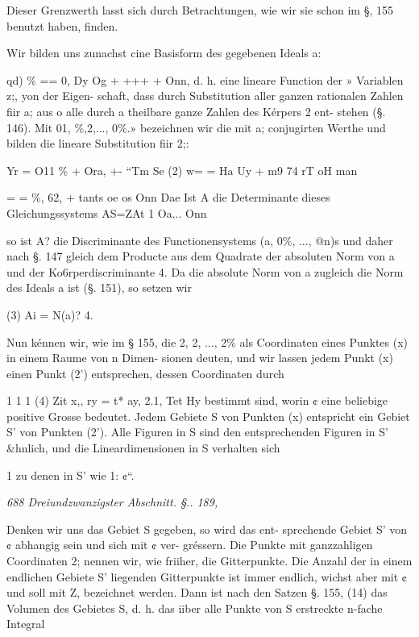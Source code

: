 \documentclass[12pt,a4paper]{article}
\theoremstyle{plain}
\theoremstyle{definition}
\begin{document}
Dieser Grenzwerth lasst sich durch Betrachtungen, wie wir sie schon im §, 155 benutzt haben, finden.

Wir bilden uns zunachst cine Basisform des gegebenen Ideals a:

qd) \% == 0, Dy Og + +++ + Onn, d. h. eine lineare Function der » Variablen z;, yon der Eigen- schaft, dass durch Substitution aller ganzen rationalen Zahlen fiir a; aus o alle durch a theilbare ganze Zahlen des Kérpers 2 ent- stehen (§. 146). Mit 01, \%,2,..., 0\%.» bezeichnen wir die mit a; conjugirten Werthe und bilden die lineare Substitution fiir 2;:

Yr = O11 \% + Ora, +- ``Tm Se (2) w= = Ha Uy + m9 74 rT oH man

= = \%, 62, + tants oe os Onn Dae Ist A die Determinante dieses Gleichungssystems AS=ZAt 1 Oa... Onn

so ist A? die Discriminante des Functionensystems (a, 0\%, ..., @n)s und daher nach §. 147 gleich dem Producte aus dem Quadrate der absoluten Norm von a und der Ko6rperdiscriminante 4. Da die absolute Norm von a zugleich die Norm des Ideals a ist (§. 151), so setzen wir

(3) Ai = N(a)? 4.

Nun kénnen wir, wie im § 155, die 2, 2, ..., 2\% als Coordinaten eines Punktes (x) in einem Raume von n Dimen- sionen deuten, und wir lassen jedem Punkt (x) einen Punkt (2') entsprechen, dessen Coordinaten durch

1 1 1 (4) Zit x,, ry = t* ay, 2.1, Tet Hy bestimmt sind, worin ¢ eine beliebige positive Grosse bedeutet. Jedem Gebiete S von Punkten (x) entspricht ein Gebiet S' von Punkten (2'). Alle Figuren in S sind den entsprechenden Figuren in S' \&hnlich, und die Lineardimensionen in S verhalten sich

1 zu denen in S' wie 1: ¢``.

\vspace{0.5\baselineskip}\noindent\textit{688 Dreiundzwanzigster Abschnitt. §.. 189,}\par

Denken wir uns das Gebiet S gegeben, so wird das ent- sprechende Gebiet S' von ¢ abhangig sein und sich mit ¢ ver- gréssern. Die Punkte mit ganzzahligen Coordinaten 2; nennen wir, wie friiher, die Gitterpunkte. Die Anzahl der in einem endlichen Gebiete S' liegenden Gitterpunkte ist immer endlich, wichst aber mit ¢ und soll mit Z, bezeichnet werden. Dann ist nach den Satzen §. 155, (14) das Volumen des Gebietes S, d. h. das iiber alle Punkte von S erstreckte n-fache Integral
\end{document}
